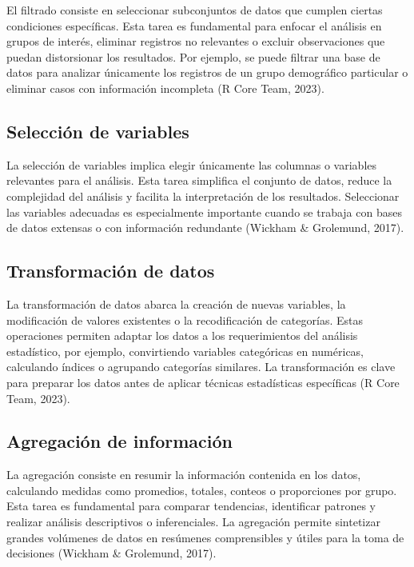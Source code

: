 \documentclass[
  spanish,
  a4paper,
  DIV=11,
  numbers=noendperiod,
  onepage,
  openany]{scrreprt}
\begin{document}
El filtrado consiste en seleccionar subconjuntos de datos que cumplen
ciertas condiciones específicas. Esta tarea es fundamental para enfocar
el análisis en grupos de interés, eliminar registros no relevantes o
excluir observaciones que puedan distorsionar los resultados. Por
ejemplo, se puede filtrar una base de datos para analizar únicamente los
registros de un grupo demográfico particular o eliminar casos con
información incompleta (R Core Team, 2023).

\subsection{Selección de variables}\label{selecciuxf3n-de-variables}

La selección de variables implica elegir únicamente las columnas o
variables relevantes para el análisis. Esta tarea simplifica el conjunto
de datos, reduce la complejidad del análisis y facilita la
interpretación de los resultados. Seleccionar las variables adecuadas es
especialmente importante cuando se trabaja con bases de datos extensas o
con información redundante (Wickham \& Grolemund, 2017).

\subsection{Transformación de datos}\label{transformaciuxf3n-de-datos}

La transformación de datos abarca la creación de nuevas variables, la
modificación de valores existentes o la recodificación de categorías.
Estas operaciones permiten adaptar los datos a los requerimientos del
análisis estadístico, por ejemplo, convirtiendo variables categóricas en
numéricas, calculando índices o agrupando categorías similares. La
transformación es clave para preparar los datos antes de aplicar
técnicas estadísticas específicas (R Core Team, 2023).

\subsection{Agregación de
información}\label{agregaciuxf3n-de-informaciuxf3n}

La agregación consiste en resumir la información contenida en los datos,
calculando medidas como promedios, totales, conteos o proporciones por
grupo. Esta tarea es fundamental para comparar tendencias, identificar
patrones y realizar análisis descriptivos o inferenciales. La agregación
permite sintetizar grandes volúmenes de datos en resúmenes comprensibles
y útiles para la toma de decisiones (Wickham \& Grolemund, 2017).
\end{document}
